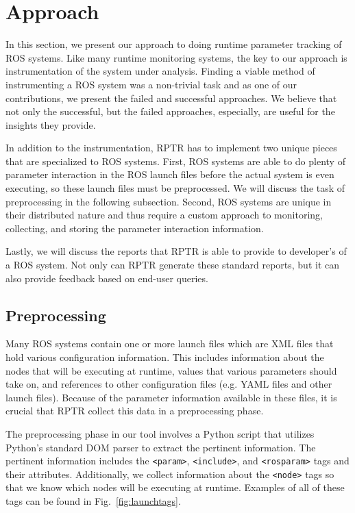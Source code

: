 \section{Approach}

In this section, we present our approach to doing runtime parameter tracking of ROS systems. Like many runtime monitoring systems, the key to our approach is instrumentation of the system under analysis. Finding a viable method of instrumenting a ROS system was a non-trivial task and as one of our contributions, we present the failed and successful approaches. We believe that not only the successful, but the failed approaches, especially, are useful for the insights they provide.

In addition to the instrumentation, RPTR has to implement two unique pieces that are specialized to ROS systems. First, ROS systems are able to do plenty of parameter interaction in the ROS launch files before the actual system is even executing, so these launch files must be preprocessed. We will discuss the task of preprocessing in the following subsection. Second, ROS systems are unique in their distributed nature and thus require a custom approach to monitoring, collecting, and storing the parameter interaction information.

Lastly, we will discuss the reports that RPTR is able to provide to developer's of a ROS system. Not only can RPTR generate these standard reports, but it can also provide feedback based on end-user queries.


\subsection{Preprocessing}

Many ROS systems contain one or more launch files which are XML files that hold various configuration information. This includes information about the nodes that will be executing at runtime, values that various parameters should take on, and references to other configuration files (e.g. YAML files and other launch files). Because of the parameter information available in these files, it is crucial that RPTR collect this data in a preprocessing phase.

The preprocessing phase in our tool involves a Python script that utilizes Python's standard DOM parser to extract the pertinent information. The pertinent information includes the \texttt{<param>}, \texttt{<include>}, and \texttt{<rosparam>} tags and their attributes. Additionally, we collect information about the \texttt{<node>} tags so that we know which nodes will be executing at runtime. Examples of all of these tags can be found in Fig.~\ref{fig:launchtags}.

